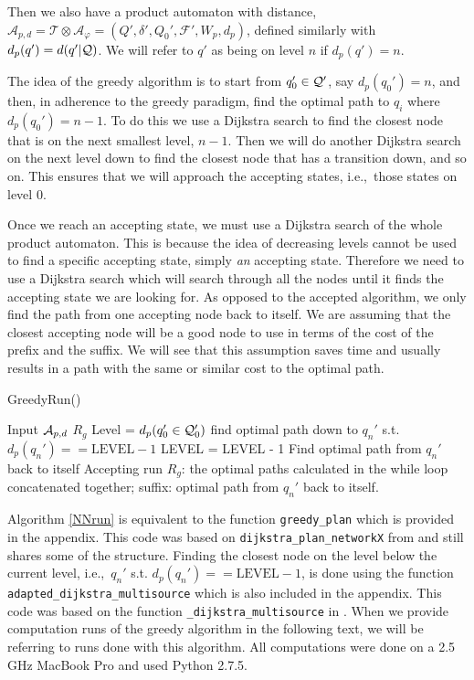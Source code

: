 Then we also have a product automaton with distance, $\mathcal{A}_{p,d} = \mathcal{T} \otimes \mathcal{A}_\varphi = (Q', \delta', Q_0', \mathcal{F}', W_p, d_p)$, defined similarly with $d_p(q') = d(q'|\mathcal{Q})$. We will refer to $q'$ as being on level $n$ if $d_p(q') = n$.

The idea of the greedy algorithm is to start from $q_0' \in \mathcal{Q}'$, say $d_p(q_0')=n$, and then, in adherence to the greedy paradigm, find the optimal path to $q_i$ where $d_p(q_0')=n-1$. To do this we use a Dijkstra search to find the closest node that is on the next smallest level, $n-1$. Then we will do another Dijkstra search on the next level down to find the closest node that has a transition down, and so on. This ensures that we will approach the accepting states, i.e.,\ those states on level 0. 

Once we reach an accepting state, we must use a Dijkstra search of the whole product automaton. This is because the idea of decreasing levels cannot be used to find a specific accepting state, simply \textit{an} accepting state. Therefore we need to use a Dijkstra search which will search through all the nodes until it finds the accepting state we are looking for. As opposed to the accepted algorithm, we only find the path from one accepting node back to itself. We are assuming that the closest accepting node will be a good node to use in terms of the cost of the prefix and the suffix. We will see that this assumption saves time and usually results in a path with the same or similar cost to the optimal path. %
\begin{algorithm}
\caption{GreedyRun()}\label{NNrun}
\begin{algorithmic}[1]
\Require Input $\mathcal{A}_{p,d}$
\Ensure $R_{g}$
\State Level = $d_p(q_0' \in \mathcal{Q}_0')$
\State find optimal path down to $q_n'$ s.t. $d_p(q_n')==\text{LEVEL}-1$ %
\State	LEVEL = LEVEL - 1
\EndWhile
\State Find optimal path from $q_n'$ back to itself
\State Accepting run $R_g$: the optimal paths calculated in the while loop concatenated together; suffix: optimal path from $q_n'$ back to itself.
\end{algorithmic}
\end{algorithm}

Algorithm \ref{NNrun} is equivalent to the function \texttt{greedy\_plan} which is provided in the appendix. This code was based on \texttt{dijkstra\_plan\_networkX} from \cite{pMasGit} and still shares some of the structure. Finding the closest node on the level below the current level, i.e.,\ $q_n'$ s.t. $d_p(q_n')==\text{LEVEL}-1$, is done using the function \texttt{adapted\_dijkstra\_multisource} which is also included in the appendix. This code was based on the function  \texttt{\_dijkstra\_multisource} in \cite{schult08}. When we provide computation runs of the greedy algorithm in the following text, we will be referring to runs done with this algorithm. All computations were done on a 2.5 GHz MacBook Pro and used Python 2.7.5.%

